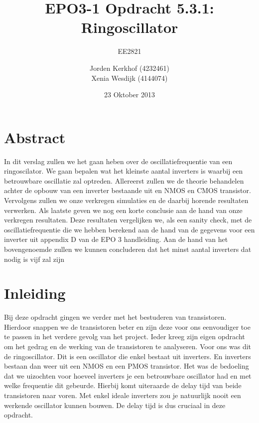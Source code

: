 \documentclass{scrartcl}  %
\author{Jorden {Kerkhof} (4232461)  \\{Xenia Wesdijk} (4144074)}
\title{EPO3-1   Opdracht 5.3.1: Ringoscillator}
\subtitle{EE2821}
\date{23 Oktober 2013}
\begin{document}
\maketitle
\vspace{80 mm}
\section*{Abstract}
In dit verslag zullen we het gaan heben over de oscillatiefrequentie van een ringoscilator. We gaan bepalen wat het kleinste aantal inverters is waarbij een betrouwbare oscillatie zal optreden. Allereerst zullen we de theorie behandelen achter de opbouw van een inverter bestaande uit en NMOS en CMOS transistor. Vervolgens zullen we onze verkregen simulaties en de daarbij horende resultaten verwerken. Als laatste geven we nog een korte conclusie aan de hand van onze verkregen resultaten. Deze resultaten vergelijken we, als een sanity check, met de oscillatiefrequentie die we hebben berekend aan de hand van de gegevens voor een inverter uit appendix D van de EPO 3 handleiding. Aan de hand van het bovengenoemde zullen we kunnen concluderen dat het minst aantal inverters dat nodig is vijf zal zijn

\newpage
\setlength{\cftbeforetoctitleskip}{-3em}
\tableofcontents
\newpage
\section{Inleiding}
Bij deze opdracht gingen we verder met het bestuderen van transistoren. Hierdoor snappen we de transistoren beter en zijn deze voor ons eenvoudiger toe te passen in het verdere gevolg van het project. Ieder kreeg zijn eigen opdracht om het gedrag en de werking van de transistoren te analyseren. Voor ons was dit de ringoscillator. Dit is een oscillator die enkel bestaat uit inverters. En inverters bestaan dan weer uit een NMOS en een PMOS transistor. Het was de bedoeling dat we uizochten voor hoeveel inverters je een betrouwbare oscillator had en met welke frequentie dit gebeurde. Hierbij komt uiteraarde de delay tijd van beide transistoren naar voren. Met enkel ideale inverters zou je natuurlijk nooit een werkende oscillator kunnen bouwen. De delay tijd is dus cruciaal in deze opdracht.  
\end{document}
